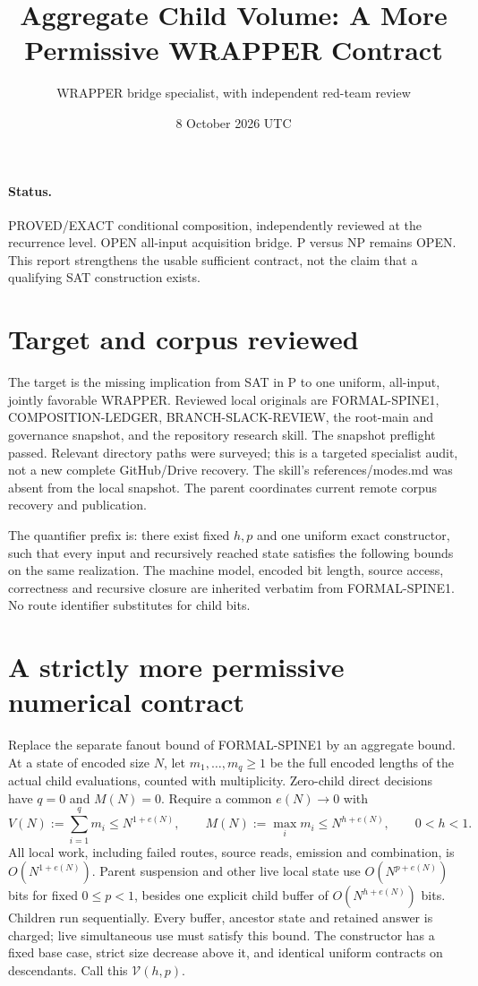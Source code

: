 \documentclass[11pt]{article}
\title{Aggregate Child Volume: A More Permissive WRAPPER Contract}
\author{WRAPPER bridge specialist, with independent red-team review}
\date{8 October 2026 UTC}
\begin{document}
\sloppy\maketitle
\paragraph{Status.} PROVED/EXACT conditional composition, independently
reviewed at the recurrence level. OPEN all-input acquisition bridge.
P versus NP remains OPEN. This report strengthens the usable sufficient
contract, not the claim that a qualifying SAT construction exists.

\section{Target and corpus reviewed}
The target is the missing implication from SAT in P to one uniform,
all-input, jointly favorable WRAPPER. Reviewed local originals are
FORMAL-SPINE1, COMPOSITION-LEDGER, BRANCH-SLACK-REVIEW, the root-main and
governance snapshot, and the repository research skill. The snapshot
preflight passed. Relevant directory paths were surveyed; this is a
targeted specialist audit, not a new complete GitHub/Drive recovery.
The skill's references/modes.md was absent from the local snapshot.
The parent coordinates current remote corpus recovery and publication.

The quantifier prefix is: there exist fixed $h,p$ and one uniform exact
constructor, such that every input and recursively reached state satisfies
the following bounds on the same realization. The machine model, encoded
bit length, source access, correctness and recursive closure are inherited
verbatim from FORMAL-SPINE1. No route identifier substitutes for child bits.

\section{A strictly more permissive numerical contract}
Replace the separate fanout bound of FORMAL-SPINE1 by an aggregate bound.
At a state of encoded size $N$, let $m_1,\ldots,m_q\ge1$ be the full
encoded lengths of the actual child evaluations, counted with multiplicity.
Zero-child direct decisions have $q=0$ and $M(N)=0$.
Require a common $e(N)\to0$ with
\[
 V(N):=\sum_{i=1}^q m_i\le N^{1+e(N)},\qquad
 M(N):=\max_i m_i\le N^{h+e(N)},\qquad 0<h<1.
\]
All local work, including failed routes, source reads, emission and
combination, is $O(N^{1+e(N)})$. Parent suspension and other live local
state use $O(N^{p+e(N)})$ bits for fixed $0\le p<1$, besides one explicit child
buffer of $O(N^{h+e(N)})$ bits. Children run sequentially. Every buffer,
ancestor state and retained answer is charged; live simultaneous use must
satisfy this bound. The constructor has a fixed base case, strict size
decrease above it, and identical uniform contracts on descendants.
Call this $\mathcal V(h,p)$.
\end{document}
